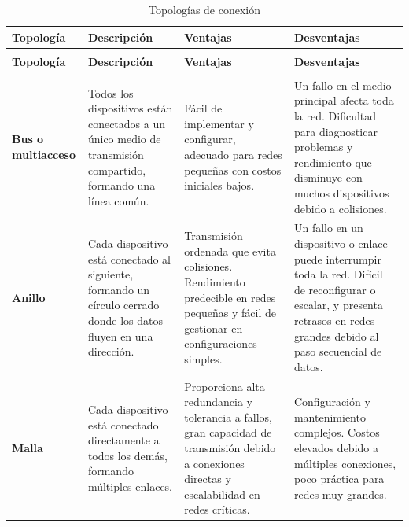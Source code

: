 \begin{longtable}{|>{\raggedright\arraybackslash}p{1.8cm}|>{\raggedright\arraybackslash}p{4.2cm}|>{\raggedright\arraybackslash}p{4.2cm}|>{\raggedright\arraybackslash}p{4.2cm}|}
\caption{Topologías de conexión} \label{tab:comparacion_topologias} \\
\hline
\textbf{Topología}\cite{CalderaPalma} & \textbf{Descripción} & \textbf{Ventajas} & \textbf{Desventajas} \\ \hline
\endfirsthead

\multicolumn{4}{l}{\small\bfseries \tablename\ \thetable\ -- continuación} \\ \hline
\textbf{Topología} & \textbf{Descripción} & \textbf{Ventajas} & \textbf{Desventajas} \\ \hline
\endhead

\hline
\multicolumn{4}{r}{\itshape Continúa en la siguiente página...} \\
\endfoot
\hline
\endlastfoot

\textbf{Bus o multiacceso} & Todos los dispositivos están conectados a un único medio de transmisión compartido, formando una línea común. & Fácil de implementar y configurar, adecuado para redes pequeñas con costos iniciales bajos. & Un fallo en el medio principal afecta toda la red. Dificultad para diagnosticar problemas y rendimiento que disminuye con muchos dispositivos debido a colisiones. \\ \hline

\textbf{Anillo} & Cada dispositivo está conectado al siguiente, formando un círculo cerrado donde los datos fluyen en una dirección. & Transmisión ordenada que evita colisiones. Rendimiento predecible en redes pequeñas y fácil de gestionar en configuraciones simples. & Un fallo en un dispositivo o enlace puede interrumpir toda la red. Difícil de reconfigurar o escalar, y presenta retrasos en redes grandes debido al paso secuencial de datos. \\ \hline

\textbf{Malla} & Cada dispositivo está conectado directamente a todos los demás, formando múltiples enlaces. & Proporciona alta redundancia y tolerancia a fallos, gran capacidad de transmisión debido a conexiones directas y escalabilidad en redes críticas. & Configuración y mantenimiento complejos. Costos elevados debido a múltiples conexiones, poco práctica para redes muy grandes. \\ \hline


\end{longtable}
